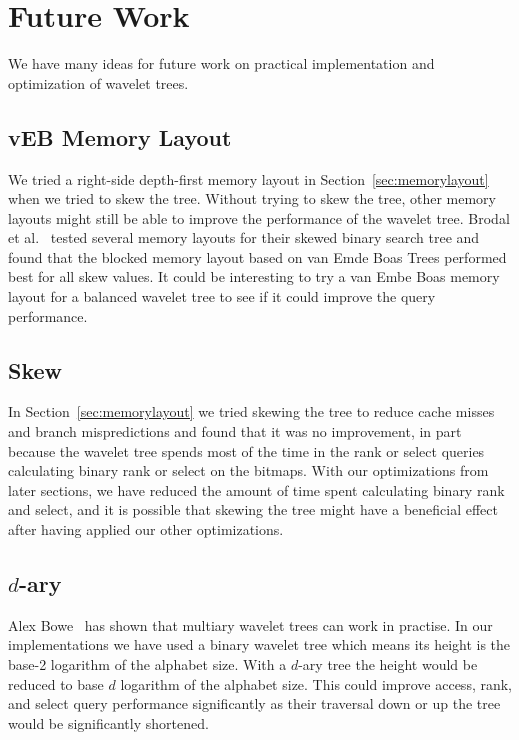 \section{Future Work}
We have many ideas for future work on practical implementation and optimization of wavelet trees.

\subsection{vEB Memory Layout}
\label{sec:futurework_vebmemorylayout}
We tried a right-side depth-first memory layout in Section~\ref{sec:memorylayout} when we tried to skew the tree.
Without trying to skew the tree, other memory layouts might still be able to improve the performance of the wavelet tree.
Brodal et al.~ tested several memory layouts for their skewed binary search tree and found that the blocked memory layout based on van Emde Boas Trees performed best for all skew values.
It could be interesting to try a van Embe Boas memory layout for a balanced wavelet tree to see if it could improve the query performance.

\subsection{Skew}
In Section~\ref{sec:memorylayout} we tried skewing the tree to reduce cache misses and branch mispredictions and found that it was no improvement, in part because the wavelet tree spends most of the time in the rank or select queries calculating binary rank or select on the bitmaps.
With our optimizations from later sections, we have reduced the amount of time spent calculating binary rank and select, and it is possible that skewing the tree might have a beneficial effect after having applied our other optimizations.

\subsection{$d$-ary}
Alex Bowe~ has shown that multiary wavelet trees can work in practise.
In our implementations we have used a binary wavelet tree which means its height is the base-2 logarithm of the alphabet size.
With a $d$-ary tree the height would be reduced to base $d$ logarithm of the alphabet size.
This could improve access, rank, and select query performance significantly as their traversal down or up the tree would be significantly shortened.


